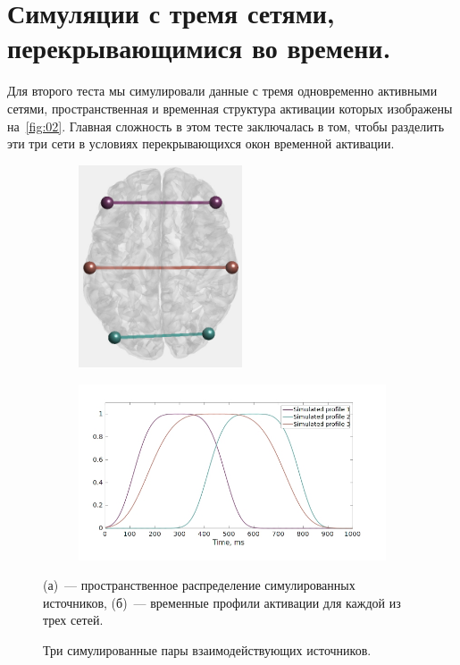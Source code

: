\section{Симуляции с тремя сетями, перекрывающимися во времени.}\label{sec:three_ntw}
Для второго теста мы симулировали данные с тремя одновременно активными сетями, пространственная
и временная структура активации которых изображены на~\ref{fig:02}.
Главная сложность в этом тесте заключалась в том, чтобы разделить эти три сети в условиях
перекрывающихся окон временной активации.

\begin{figure}[htbp]
    \begin{subfigure}[t]{0.5\textwidth}
        \centering
        \includegraphics[angle = 90, height = 6cm]{../images/psiicos_paper/Figure2a_hr.jpg}\label{fig:2a}
        \caption{}
    \end{subfigure}
    \begin{subfigure}[t]{0.5\textwidth}
        \centering
        \includegraphics[width=1\textwidth]{../images/psiicos_paper/Figure2b_hr.jpg}\label{fig:2b}
        \caption{}
    \end{subfigure}
    \caption{Три симулированные пары взаимодействующих источников.}\label{02}
        (а)~--- пространственное распределение симулированных источников,
        (б)~--- временные профили активации для каждой из трех сетей.
\end{figure}


